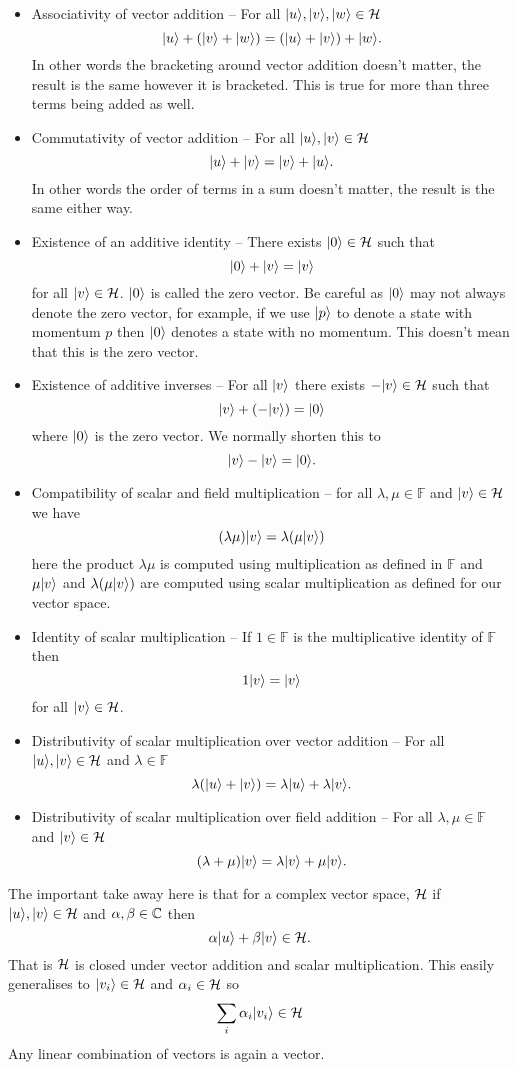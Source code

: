     \begin{itemize}
        \item Associativity of vector addition -- For all \(\vert {u} \rangle, \vert {v} \rangle, \vert {w} \rangle\in\mathcal{H}\)
        \[\vert {u} \rangle + (\vert {v} \rangle + \vert {w} \rangle) = (\vert {u} \rangle + \vert {v} \rangle) + \vert {w} \rangle.\]
        In other words the bracketing around vector addition doesn't matter, the result is the same however it is bracketed.
        This is true for more than three terms being added as well.
        \item Commutativity of vector addition -- For all \(\vert {u} \rangle, \vert {v} \rangle\in\mathcal{H}\)
        \[\vert {u} \rangle + \vert {v} \rangle = \vert {v} \rangle + \vert {u} \rangle.\]
        In other words the order of terms in a sum doesn't matter, the result is the same either way.
        \item Existence of an additive identity -- There exists \(\vert {0} \rangle\in\mathcal{H}\) such that 
        \[\vert {0} \rangle + \vert {v} \rangle = \vert {v} \rangle\]
        for all \(\vert {v} \rangle\in\mathcal{H}\).
        \(\vert {0} \rangle\) is called the zero vector.
        Be careful as \(\vert {0} \rangle\) may not always denote the zero vector, for example, if we use \(\vert {p} \rangle\) to denote a state with momentum \(p\) then \(\vert {0} \rangle\) denotes a state with no momentum.
        This doesn't mean that this is the zero vector.
        \item Existence of additive inverses -- For all \(\vert {v} \rangle\) there exists \(-\vert {v} \rangle\in\mathcal{H}\) such that
        \[\vert {v} \rangle + (-\vert {v} \rangle) = \vert {0} \rangle\]
        where \(\vert {0} \rangle\) is the zero vector.
        We normally shorten this to
        \[\vert {v} \rangle - \vert {v} \rangle = \vert {0} \rangle.\]
        \item Compatibility of scalar and field multiplication -- for all \(\lambda, \mu\in\mathbb{F}\) and \(\vert {v} \rangle\in\mathcal{H}\) we have
        \[(\lambda\mu)\vert {v} \rangle = \lambda(\mu\vert {v} \rangle)\]
        here the product \(\lambda\mu\) is computed using multiplication as defined in \(\mathbb{F}\) and \(\mu\vert {v} \rangle\) and \(\lambda(\mu\vert {v} \rangle)\) are computed using scalar multiplication as defined for our vector space.
        \item Identity of scalar multiplication -- If \(1\in\mathbb{F}\) is the multiplicative identity of \(\mathbb{F}\) then
        \[1\vert {v} \rangle = \vert {v} \rangle\]
        for all \(\vert {v} \rangle\in\mathcal{H}\).
        \item Distributivity of scalar multiplication over vector addition -- For all \(\vert {u} \rangle, \vert {v} \rangle\in\mathcal{H}\) and \(\lambda\in\mathbb{F}\)
        \[\lambda(\vert {u} \rangle + \vert {v} \rangle) = \lambda\vert {u} \rangle + \lambda\vert {v} \rangle.\]
        \item Distributivity of scalar multiplication over field addition -- For all \(\lambda, \mu\in\mathbb{F}\) and \(\vert {v} \rangle\in\mathcal{H}\)
        \[(\lambda + \mu)\vert {v} \rangle = \lambda\vert {v} \rangle + \mu\vert {v} \rangle.\]
    \end{itemize}
    The important take away here is that for a complex vector space, \(\mathcal{H}\) if \(\vert {u} \rangle, \vert {v} \rangle\in\mathcal{H}\) and \(\alpha, \beta\in\mathbb{C}\) then
    \[\alpha\vert {u} \rangle + \beta\vert {v} \rangle \in \mathcal{H}.\]
    That is \(\mathcal{H}\) is closed under vector addition and scalar multiplication.
    This easily generalises to \(\vert {v_i} \rangle\in\mathcal{H}\) and \(\alpha_i\in\mathcal{H}\) so
    \[\sum_i\alpha_i\vert {v_i} \rangle\in\mathcal{H}\]
    Any linear combination of vectors is again a vector.
    
